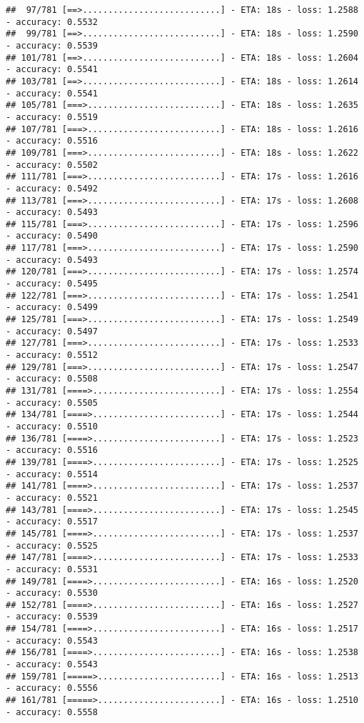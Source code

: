 \documentclass[
]{article}
\begin{document}
\begin{verbatim}
##  97/781 [==>...........................] - ETA: 18s - loss: 1.2588 - accuracy: 0.5532
##  99/781 [==>...........................] - ETA: 18s - loss: 1.2590 - accuracy: 0.5539
## 101/781 [==>...........................] - ETA: 18s - loss: 1.2604 - accuracy: 0.5541
## 103/781 [==>...........................] - ETA: 18s - loss: 1.2614 - accuracy: 0.5541
## 105/781 [===>..........................] - ETA: 18s - loss: 1.2635 - accuracy: 0.5519
## 107/781 [===>..........................] - ETA: 18s - loss: 1.2616 - accuracy: 0.5516
## 109/781 [===>..........................] - ETA: 18s - loss: 1.2622 - accuracy: 0.5502
## 111/781 [===>..........................] - ETA: 17s - loss: 1.2616 - accuracy: 0.5492
## 113/781 [===>..........................] - ETA: 17s - loss: 1.2608 - accuracy: 0.5493
## 115/781 [===>..........................] - ETA: 17s - loss: 1.2596 - accuracy: 0.5490
## 117/781 [===>..........................] - ETA: 17s - loss: 1.2590 - accuracy: 0.5493
## 120/781 [===>..........................] - ETA: 17s - loss: 1.2574 - accuracy: 0.5495
## 122/781 [===>..........................] - ETA: 17s - loss: 1.2541 - accuracy: 0.5499
## 125/781 [===>..........................] - ETA: 17s - loss: 1.2549 - accuracy: 0.5497
## 127/781 [===>..........................] - ETA: 17s - loss: 1.2533 - accuracy: 0.5512
## 129/781 [===>..........................] - ETA: 17s - loss: 1.2547 - accuracy: 0.5508
## 131/781 [====>.........................] - ETA: 17s - loss: 1.2554 - accuracy: 0.5505
## 134/781 [====>.........................] - ETA: 17s - loss: 1.2544 - accuracy: 0.5510
## 136/781 [====>.........................] - ETA: 17s - loss: 1.2523 - accuracy: 0.5516
## 139/781 [====>.........................] - ETA: 17s - loss: 1.2525 - accuracy: 0.5514
## 141/781 [====>.........................] - ETA: 17s - loss: 1.2537 - accuracy: 0.5521
## 143/781 [====>.........................] - ETA: 17s - loss: 1.2545 - accuracy: 0.5517
## 145/781 [====>.........................] - ETA: 17s - loss: 1.2537 - accuracy: 0.5525
## 147/781 [====>.........................] - ETA: 17s - loss: 1.2533 - accuracy: 0.5531
## 149/781 [====>.........................] - ETA: 16s - loss: 1.2520 - accuracy: 0.5530
## 152/781 [====>.........................] - ETA: 16s - loss: 1.2527 - accuracy: 0.5539
## 154/781 [====>.........................] - ETA: 16s - loss: 1.2517 - accuracy: 0.5543
## 156/781 [====>.........................] - ETA: 16s - loss: 1.2538 - accuracy: 0.5543
## 159/781 [=====>........................] - ETA: 16s - loss: 1.2513 - accuracy: 0.5556
## 161/781 [=====>........................] - ETA: 16s - loss: 1.2510 - accuracy: 0.5558

\end{verbatim}
\end{document}

